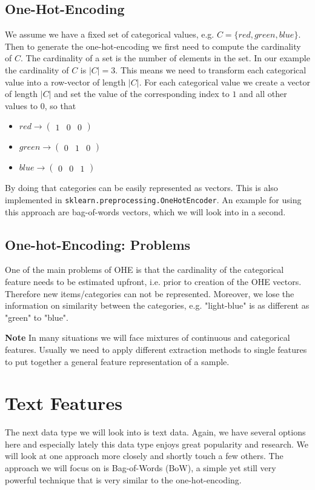 \subsection{One-Hot-Encoding}
We assume we have a fixed set of categorical values, e.g. $C = \{red, green, blue\}$. Then to generate the one-hot-encoding we first need to compute the cardinality of $C$.
The cardinality of a set is the number of elements in the set. In our example the cardinality of $C$ is $|C| = 3$. This means we need to transform each categorical value into a row-vector of length $|C|$.
For each categorical value we create a vector of length $|C|$ and set the value of the corresponding index to $1$ and all other values to $0$, so that
\begin{itemize}
  \item $red \rightarrow \begin{pmatrix}1 & 0 & 0\end{pmatrix}$
  \item $green \rightarrow \begin{pmatrix}0 & 1 & 0\end{pmatrix}$
  \item $blue \rightarrow \begin{pmatrix}0 & 0 & 1\end{pmatrix}$
\end{itemize}
By doing that categories can be easily represented as vectors.
This is also implemented in \lstinline{sklearn.preprocessing.OneHotEncoder}.
An example for using this approach are bag-of-words vectors, which we will look into in a second.

\subsection{One-hot-Encoding: Problems}
One of the main problems of OHE is that the cardinality of the categorical feature needs to be estimated upfront, i.e. prior to creation of the OHE vectors.
Therefore new items/categories can not be represented. Moreover, we lose the information on similarity between the categories, e.g. "light-blue" is as different as "green" to "blue".

\textbf{Note} In many situations we will face mixtures of continuous and categorical features. Usually we need to apply different extraction methods
to single features to put together a general feature representation of a sample.
\section{Text Features}
The next data type we will look into is text data. Again, we have several options here and especially lately this data type enjoys great popularity and research.
We will look at one approach more closely and shortly touch a few others.
The approach we will focus on is Bag-of-Words (BoW), a simple yet still very powerful technique that is very similar to the one-hot-encoding.
